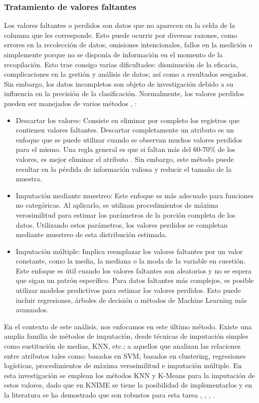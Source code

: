 \subsubsection*{Tratamiento de valores faltantes} \label{secc:mv}
Los valores faltantes o perdidos son datos que no aparecen en la celda de la columna que les corresponde. Esto puede ocurrir por diversas razones, como errores en la recolección de datos, omisiones intencionales, fallos en la medición o simplemente porque no se disponía de información en el momento de la recopilación. Esto trae consigo varias dificultades: disminución de la eficacia, complicaciones en la gestión y análisis de datos; así como a resultados sesgados. Sin embargo, los datos incompletos son objeto de investigación debido a su influencia en la precisión de la clasificación. Normalmente, los valores perdidos pueden ser manejados de varios métodos \citep{garcia2015data}, \citep{ventevogel2020construction}:
\begin{itemize}
	\item Descartar los valores: Consiste en eliminar por completo los registros que contienen valores faltantes. Descartar completamente un atributo es un enfoque que se puede utilizar cuando se observan muchos valores perdidos para el mismo. Una regla general es que si faltan más del 60-70\% de los valores, es mejor eliminar el atributo \citep{ventevogel2020construction}. Sin embargo, este método puede resultar en la pérdida de información valiosa y reducir el tamaño de la muestra.
	\item Imputación mediante muestreo: Este enfoque es más adecuado para funciones no categóricas. Al aplicarlo, se utilizan procedimientos de máxima verosimilitud para estimar los parámetros de la porción completa de los datos. Utilizando estos parámetros, los valores perdidos se completan mediante muestreo de esta distribución estimada.
	\item Imputación múltiple: Implica reemplazar los valores faltantes por un valor constante, como la media, la mediana o la moda de la variable en cuestión. Este enfoque es útil cuando los valores faltantes son aleatorios y no se espera que sigan un patrón específico. Para datos faltantes más complejos, es posible utilizar modelos predictivos para estimar los valores perdidos. Esto puede incluir regresiones, árboles de decisión o métodos de Machine Learning más avanzados.
\end{itemize}
En el contexto de este análisis, nos enfocamos en este último método. Existe una amplia familia de métodos de imputación, desde técnicas de imputación simples como sustitución de medias, KNN, etc.; a aquellos que analizan las relaciones entre atributos tales como: basados en SVM, basados en clustering, regresiones logísticas, procedimientos de máxima verosimilitud e imputación múltiple. En esta investigación se emplean los métodos KNN y K-Means para la imputación de estos valores, dado que en KNIME se tiene la posibilidad de implementarlos y en la literatura se ha demostrado que son robustos para esta tarea \citep{tsai2022empirical}, \citep{batista2003analysis}, \citep{patil2010missing}, \citep{li2004towards}.\\
